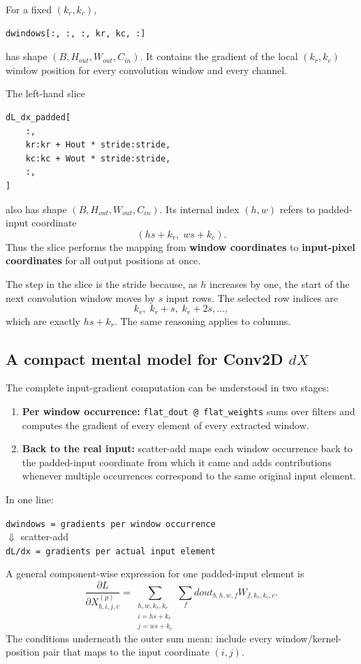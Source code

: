 \documentclass[11pt,a4paper]{article}
\newcommand{\pd}[2]{\frac{\partial #1}{\partial #2}}
\newcommand{\code}[1]{\texttt{#1}}
\begin{document}
For a fixed $(k_r,k_c)$,
\begin{lstlisting}
dwindows[:, :, :, kr, kc, :]
\end{lstlisting}
has shape $(B,H_{out},W_{out},C_{in})$. It contains the gradient of the local $(k_r,k_c)$ window position for every convolution window and every channel.

The left-hand slice
\begin{lstlisting}
dL_dx_padded[
    :,
    kr:kr + Hout * stride:stride,
    kc:kc + Wout * stride:stride,
    :,
]
\end{lstlisting}
also has shape $(B,H_{out},W_{out},C_{in})$. Its internal index $(h,w)$ refers to padded-input coordinate
\[
(hs+k_r,\;ws+k_c).
\]
Thus the slice performs the mapping from \textbf{window coordinates} to \textbf{input-pixel coordinates} for all output positions at once.

The step in the slice is the stride because, as $h$ increases by one, the start of the next convolution window moves by $s$ input rows. The selected row indices are
\[
k_r,\;k_r+s,\;k_r+2s,\ldots,
\]
which are exactly $hs+k_r$. The same reasoning applies to columns.

\subsection{A compact mental model for Conv2D $dX$}

The complete input-gradient computation can be understood in two stages:
\begin{enumerate}[leftmargin=2em]
    \item \textbf{Per window occurrence:} \code{flat\_dout @ flat\_weights} sums over filters and computes the gradient of every element of every extracted window.
    \item \textbf{Back to the real input:} scatter-add maps each window occurrence back to the padded-input coordinate from which it came and adds contributions whenever multiple occurrences correspond to the same original input element.
\end{enumerate}

In one line:
\begin{center}
\code{dwindows = gradients per window occurrence}\\
$\Downarrow$ scatter-add\\
\code{dL/dx = gradients per actual input element}
\end{center}

A general component-wise expression for one padded-input element is
\[
\boxed{
\pd{L}{X^{(p)}_{b,i,j,c}}
=
\sum_{\substack{h,w,k_r,k_c\\i=hs+k_r\\j=ws+k_c}}
\sum_f
 dout_{b,h,w,f}W_{f,k_r,k_c,c}
}.
\]
The conditions underneath the outer sum mean: include every window/kernel-position pair that maps to the input coordinate $(i,j)$.
\end{document}
